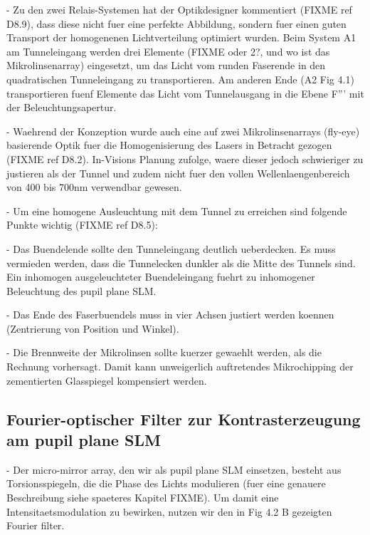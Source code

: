  - Zu den zwei Relais-Systemen hat der Optikdesigner kommentiert
   (FIXME ref D8.9), dass diese nicht fuer eine perfekte Abbildung,
   sondern fuer einen guten Transport der homogenenen Lichtverteilung    %
   optimiert wurden. Beim System A1 am Tunneleingang werden drei Elemente
   (FIXME oder 2?, und wo ist das Mikrolinsenarray) eingesetzt, um das
   Licht vom runden Faserende in den quadratischen Tunneleingang zu
   transportieren. Am anderen Ende (A2 Fig 4.1) transportieren fuenf Elemente das
   Licht vom Tunnelausgang in die Ebene F''' mit der
   Beleuchtungsapertur.

 - Waehrend der Konzeption wurde auch eine auf zwei Mikrolinsenarrays    %
   (fly-eye) basierende Optik fuer die Homogenisierung des Lasers in
   Betracht gezogen (FIXME ref D8.2). In-Visions Planung zufolge,
   waere dieser jedoch schwieriger zu justieren als der Tunnel und
   zudem nicht fuer den vollen Wellenlaengenbereich von 400 bis 700nm
   verwendbar gewesen.

  - Um eine homogene Ausleuchtung mit dem Tunnel zu erreichen sind       %
    folgende Punkte wichtig (FIXME ref D8.5):

   - Das Buendelende sollte den Tunneleingang deutlich ueberdecken. Es
     muss vermieden werden, dass die Tunnelecken dunkler als die Mitte
     des Tunnels sind. Ein inhomogen ausgeleuchteter Buendeleingang
     fuehrt zu inhomogener Beleuchtung des pupil plane SLM.

   - Das Ende des Faserbuendels muss in vier Achsen justiert werden
     koennen (Zentrierung von Position und Winkel).

   - Die Brennweite der Mikrolinsen sollte kuerzer gewaehlt werden,
     als die Rechnung vorhersagt. Damit kann unweigerlich auftretendes
     Mikrochipping der zementierten Glasspiegel kompensiert werden.

\subsection{ Fourier-optischer Filter zur Kontrasterzeugung am pupil plane SLM}
  - Der micro-mirror array, den wir als pupil plane SLM einsetzen,        %
    besteht aus Torsionsspiegeln, die die Phase des Lichts modulieren
    (fuer eine genauere Beschreibung siehe spaeteres Kapitel               
    FIXME). Um damit eine Intensitaetsmodulation zu bewirken, nutzen
    wir den in Fig 4.2 B gezeigten Fourier filter. 

